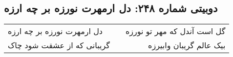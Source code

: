 \begin{center}
\section*{دوبیتی شماره ۲۴۸: دل ارمهرت نورزه بر چه ارزه}
\label{sec:248}
\begin{longtable}{l p{0.5cm} r}
دل ارمهرت نورزه بر چه ارزه
&&
گل است آندل که مهر تو نورزه
\\
گریبانی که از عشقت شود چاک
&&
بیک عالم گریبان وابیرزه
\\
\end{longtable}
\end{center}
